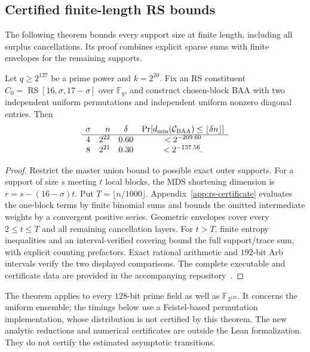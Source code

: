 \documentclass[runningheads,envcountsame,envcountsect]{llncs}
\newcommand{\F}{\mathbb F}
\newcommand{\Prb}{\Pr}
\newcommand{\cC}{\mathcal C}
\begin{document}
\subsection{Certified finite-length RS bounds}
\label{sec:rs-finite}

The following theorem bounds every support size at finite length, including
all surplus cancellations.  Its proof combines explicit sparse sums with
finite envelopes for the remaining supports.

\begin{theorem}
\label{thm:rs-finite}
Let $q\ge2^{127}$ be a prime power and $k=2^{20}$.  Fix an RS constituent
$C_0=\operatorname{RS}[16,\sigma,17-\sigma]$ over $\F_q$, and construct
chosen-block BAA with two independent uniform permutations and independent
uniform nonzero diagonal entries.  Then
\[
\begin{array}{c@{\quad}r@{\quad}c@{\quad}c}
\sigma & n & \delta &
 \Prb[d_{\min}(\cC_{\rm BAA})\le\lfloor\delta n\rfloor]\\
\hline
4 & 2^{22} & 0.60 & <2^{-209.60}\\
8 & 2^{21} & 0.30 & <2^{-137.56}.
\end{array}
\]
\end{theorem}

\begin{proof}
Restrict the master union bound to possible exact outer supports.
For a support of size $s$ meeting $t$ local blocks, the MDS shortening
dimension is $r=s-(16-\sigma)t$.  Put $T=\lfloor n/1000\rfloor$.
Appendix~\ref{app:rs-certificate} evaluates the one-block terms by finite
binomial sums and bounds the omitted intermediate weights by a convergent
positive series.  Geometric envelopes cover every $2\le t\le T$ and all
remaining cancellation layers.  For $t>T$, finite entropy inequalities and
an interval-verified covering bound the full support/trace sum, with explicit
counting prefactors.  Exact rational arithmetic and $192$-bit Arb intervals
verify the two displayed comparisons.  The complete executable and
certificate data are provided in the accompanying
repository~\cite{chosenbaaartifact}.
\end{proof}

The theorem applies to every $128$-bit prime field as well as $\F_{2^{128}}$.
It concerns the uniform ensemble; the timings below use a Feistel-based
permutation implementation, whose distribution is not certified by this theorem.
The new analytic reductions and numerical certificates are outside the Lean
formalization.  They do not certify the estimated asymptotic transitions.
\end{document}
